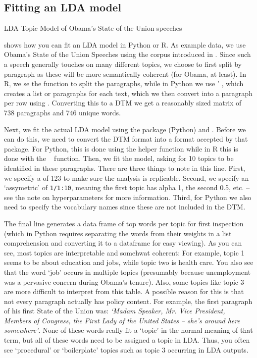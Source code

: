 \subsection{Fitting an LDA model}


\begin{ccsexample}
\caption{LDA Topic Model of Obama's State of the Union speeches}\label{ex:lda}
\end{ccsexample}

 shows how you can fit an LDA model in Python or R.
As example data, we use Obama's State of the Union Speeches using the corpus introduced in .
Since such a speech generally touches on many different topics, we choose to first split by paragraph
as these will be more semantically coherent (for Obama, at least).
In R, we se the  function to split the paragraphs,
while in Python we use \pandas' , which creates a list or paragraphs for each text,
which we then convert into a paragraph per row using .
Converting this to a DTM we get a reasonably sized matrix of 738 paragraphs and 746 unique words.

Next, we fit the actual LDA model using the package  (Python) and .
Before we can do this, we need to convert the DTM format into a format accepted by that package.
For Python, this is done using the  helper function while in R this is done with the \quanteda\  function.
Then, we fit the model, asking for 10 topics to be identified in these paragraphs.
There are three things to note in this line.
First, we specify a  of 123 to make sure the analysis is replicable.
Second, we specify an `assymetric' of \verb|1/1:10|, meaning the first topic has alpha 1, the second 0.5, etc.
-- see the note on hyperparameters for more information. 
Third, for Python we also need to specify the vocabulary names since these are not included in the DTM.

The final line generates a data frame of top words per topic for first inspection
(which in Python requires separating the words from their weights in a list comprehension and converting it to a dataframe for easy viewing).
As you can see, most topics are interpretable and somehwat coherent: For example, topic 1 seems to be about education and jobs,
while topic two is health care. You also see that the word `job' occurs in multiple topics (presumably because unemployment was a pervasive concern during Obama's tenure).
Also, some topics like topic 3 are more difficult to interpret from this table.
A possible reason for this is that not every paragraph actually has policy content.
For example, the first paragraph of his first State of the Union was:
\emph{`Madam Speaker, Mr. Vice President, Members of Congress, the First Lady of the United States -- she's around here somewhere'}.
None of these words really fit a `topic' in the normal meaning of that term,
but all of these words need to be assigned a topic in LDA.
Thus, you often see `procedural' or `boilerplate' topics such as topic 3 occurring in LDA outputs. 

